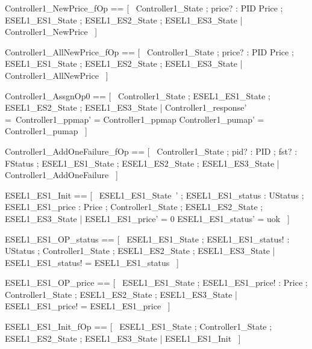 \documentclass{article}
\begin{document}
\begin{zed}
	Controller1\_NewPrice\_fOp == [~  \Xi Controller1\_State ; price? : PID \pfun Price ; \Xi ESEL1\_ES1\_State ; \Xi ESEL1\_ES2\_State ; \Xi ESEL1\_ES3\_State | \lnot \pre Controller1\_NewPrice  ~]
\end{zed}

\begin{zed}
	Controller1\_AllNewPrice\_fOp == [~  \Xi Controller1\_State ; price? : PID \pfun Price ; \Xi ESEL1\_ES1\_State ; \Xi ESEL1\_ES2\_State ; \Xi ESEL1\_ES3\_State | \lnot \pre Controller1\_AllNewPrice  ~]
\end{zed}

\begin{zed}
	Controller1\_AssgnOp0 == [~  \Delta Controller1\_State ; \Xi ESEL1\_ES1\_State ; \Xi ESEL1\_ES2\_State ; \Xi ESEL1\_ES3\_State | Controller1\_response' =~\emptyset \land Controller1\_ppmap' = Controller1\_ppmap \land Controller1\_pumap' = Controller1\_pumap  ~]
\end{zed}

\begin{zed}
	Controller1\_AddOneFailure\_fOp == [~  \Xi Controller1\_State ; pid? : PID ; fst? : FStatus ; \Xi ESEL1\_ES1\_State ; \Xi ESEL1\_ES2\_State ; \Xi ESEL1\_ES3\_State | \lnot \pre Controller1\_AddOneFailure  ~]
\end{zed}

\begin{zed}
	ESEL1\_ES1\_Init == [~  ESEL1\_ES1\_State~' ; ESEL1\_ES1\_status : UStatus ; ESEL1\_ES1\_price : Price ; \Xi Controller1\_State ; \Xi ESEL1\_ES2\_State ; \Xi ESEL1\_ES3\_State | ESEL1\_ES1\_price' = 0 \land ESEL1\_ES1\_status' = uok  ~]
\end{zed}

\begin{zed}
	ESEL1\_ES1\_OP\_status == [~  \Xi ESEL1\_ES1\_State ; ESEL1\_ES1\_status! : UStatus ; \Xi Controller1\_State ; \Xi ESEL1\_ES2\_State ; \Xi ESEL1\_ES3\_State | ESEL1\_ES1\_status! = ESEL1\_ES1\_status  ~]
\end{zed}

\begin{zed}
	ESEL1\_ES1\_OP\_price == [~  \Xi ESEL1\_ES1\_State ; ESEL1\_ES1\_price! : Price ; \Xi Controller1\_State ; \Xi ESEL1\_ES2\_State ; \Xi ESEL1\_ES3\_State | ESEL1\_ES1\_price! = ESEL1\_ES1\_price  ~]
\end{zed}

\begin{zed}
	ESEL1\_ES1\_Init\_fOp == [~  \Xi ESEL1\_ES1\_State ; \Xi Controller1\_State ; \Xi ESEL1\_ES2\_State ; \Xi ESEL1\_ES3\_State | \lnot \pre ESEL1\_ES1\_Init  ~]
\end{zed}
\end{document}
